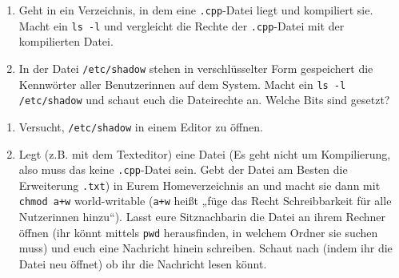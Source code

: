 \begin{praxis}
    \begin{enumerate}
        \item Geht in ein Verzeichnis, in dem eine \texttt{.cpp}-Datei liegt und
              kompiliert sie. Macht ein \texttt{ls -l} und vergleicht die Rechte der
              \texttt{.cpp}-Datei mit der kompilierten Datei.
        \item In der Datei \texttt{/etc/shadow} stehen in verschlüsselter Form
              gespeichert die Kennwörter aller Benutzerinnen auf dem System. Macht ein
              \texttt{ls -l /etc/shadow} und schaut euch die Dateirechte an. Welche
              Bits sind gesetzt?
    \end{enumerate}
\end{praxis}

\begin{spiel}
    \begin{enumerate}
        \item Versucht, \texttt{/etc/shadow} in einem Editor zu öffnen.
        \item Legt (z.B. mit dem Texteditor) eine Datei (Es geht nicht um
              Kompilierung, also muss das keine \texttt{.cpp}-Datei sein. Gebt der
              Datei am Besten die Erweiterung \texttt{.txt}) in Eurem Homeverzeichnis
              an und macht sie dann mit \texttt{chmod a+w} world-writable
              (\texttt{a+w} heißt „füge das Recht Schreibbarkeit für alle Nutzerinnen
              hinzu“).  Lasst eure Sitznachbarin die Datei an ihrem Rechner öffnen
              (ihr könnt mittels \texttt{pwd} herausfinden, in welchem Ordner sie
              suchen muss) und euch eine Nachricht hinein schreiben. Schaut nach
              (indem ihr die Datei neu öffnet) ob ihr die Nachricht lesen könnt.
    \end{enumerate}
\end{spiel}